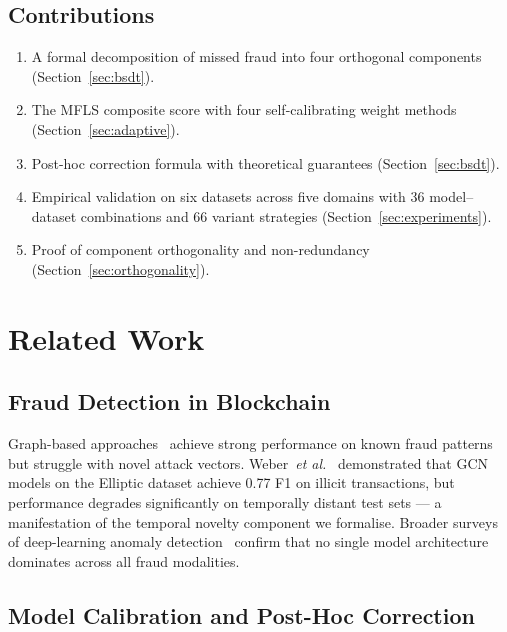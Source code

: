 \documentclass[journal]{IEEEtran}
\newcommand{\etal}{\textit{et al.}}
\begin{document}
\subsection{Contributions}
\label{ssec:contributions}

\begin{enumerate}
  \item A formal decomposition of missed fraud into four orthogonal components (Section~\ref{sec:bsdt}).
  \item The MFLS composite score with four self-calibrating weight methods (Section~\ref{sec:adaptive}).
  \item Post-hoc correction formula with theoretical guarantees (Section~\ref{sec:bsdt}).
  \item Empirical validation on six datasets across five domains with 36 model--dataset combinations and 66 variant strategies (Section~\ref{sec:experiments}).
  \item Proof of component orthogonality and non-redundancy (Section~\ref{sec:orthogonality}).
\end{enumerate}

\section{Related Work}
\label{sec:related}

\subsection{Fraud Detection in Blockchain}

Graph-based approaches~\cite{weber2019,wu2022} achieve strong performance on known fraud patterns but struggle with novel attack vectors. Weber~\etal~\cite{weber2019} demonstrated that GCN models on the Elliptic dataset achieve 0.77 F1 on illicit transactions, but performance degrades significantly on temporally distant test sets --- a manifestation of the temporal novelty component we formalise. Broader surveys of deep-learning anomaly detection~\cite{xu2020} confirm that no single model architecture dominates across all fraud modalities.

\subsection{Model Calibration and Post-Hoc Correction}
\end{document}
